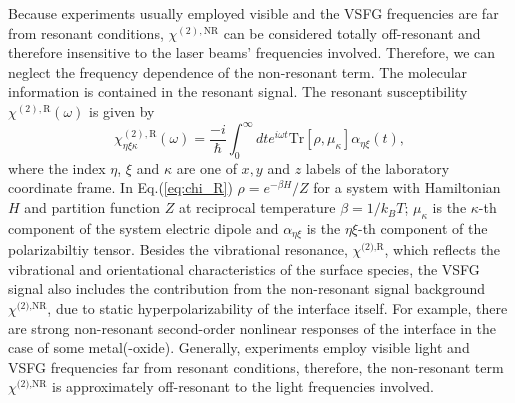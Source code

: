 %
Because experiments usually employed visible and the VSFG frequencies are far from resonant 
conditions, $\chi^{(2),\text{NR}}$ can be considered totally off-resonant and therefore 
insensitive to the laser beams' frequencies involved. Therefore, we can neglect the 
frequency dependence of the non-resonant term.
The molecular information is contained in the resonant signal. The resonant susceptibility $\chi^{(2),\text{R}}(\omega)$ is given by 
\begin{equation}
  \chi_{\eta\xi\kappa}^{(2),\text{R}}(\omega)=\frac{-i}{\hbar}\int_0^\infty dt e^{i\omega t} \text{Tr}{[\rho,\mu_\kappa]\alpha_{\eta\xi}(t)},
\label{eq:chi_R}
\end{equation}
where the index $\eta$, $\xi$ and $\kappa$ are one of $x, y$ and $z$ labels of the laboratory coordinate frame.
In Eq.\thinspace(\ref{eq:chi_R}) $\rho=e^{-\beta H}/Z$ for a system with Hamiltonian $H$ and partition function $Z$ at reciprocal temperature $\beta=1/k_BT$;
$\mu_\kappa$ is the $\kappa$-th component of the system electric dipole and ${\alpha_{\eta\xi}}$ is the $\eta\xi$-th component of the polarizabiltiy tensor\cite{1995SM}.
Besides the vibrational resonance, $\chi^{\text{(2),R}}$, which reflects the vibrational and orientational characteristics of the surface species, 
the VSFG signal also includes the contribution from the non-resonant signal background $\chi^{\text{(2),NR}}$, 
due to static hyperpolarizability of the interface itself\cite{CheM2012}.  
For example, there are strong non-resonant second-order nonlinear responses\cite{Pradier11,Vanselow2012,Wieckowski99} of the interface in the case of some metal(-oxide). 
Generally, experiments employ visible light and VSFG frequencies far from resonant conditions, therefore, the non-resonant 
term $\chi^{\text{(2),NR}}$ is approximately off-resonant to the light frequencies involved\cite{Morita2002}.

